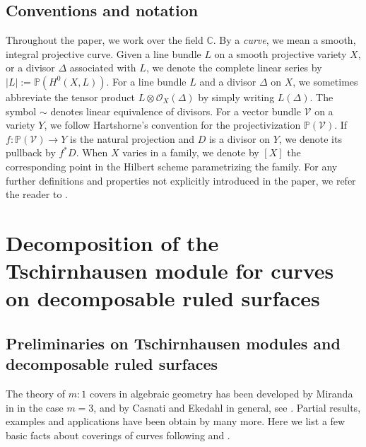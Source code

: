 \documentclass[a4paper,12pt]{amsart}
\begin{document}
\subsection*{Conventions and notation}

Throughout the paper, we work over the field $\mathbb{C}$. By a \emph{curve}, we mean a smooth, integral projective curve. Given a line bundle $L$ on a smooth projective variety $X$, or a divisor $\Delta$ associated with $L$, we denote the complete linear series by $|L| := \mathbb P\left(H^0(X,L)\right)$. For a line bundle $L$ and a divisor $\Delta$ on $X$, we sometimes abbreviate the tensor product $L \otimes \mathcal{O}_X (\Delta)$ by simply writing $L(\Delta)$. The symbol $\sim$ denotes linear equivalence of divisors.
For a vector bundle $\mathcal{V}$ on a variety $Y$, we follow Hartshorne's convention for the projectivization $\mathbb{P} (\mathcal{V})$. If $f : \mathbb{P} (\mathcal{V}) \to Y$ is the natural projection and $D$ is a divisor on $Y$, we denote its pullback by $f^{\ast} D$. When $X$ varies in a family, we denote by  $[X]$ the corresponding point in the Hilbert scheme parametrizing the family. For any further definitions and properties not explicitly introduced in the paper, we refer the reader to \cite{Hart77}.

\medskip



\section{Decomposition of the Tschirnhausen module for curves on decomposable ruled surfaces}\label{Sec2}

\subsection{Preliminaries on Tschirnhausen modules and decomposable ruled surfaces}\label{Sec2.1}

The theory of $m:1$ covers in algebraic geometry has been developed by Miranda in \cite{Mir85} in the case $m = 3$, and by Casnati and Ekedahl in general, see \cite{CE96}. Partial results, examples and applications have been obtain by many more. Here we list a few basic facts about coverings of curves following \cite{CE96} and \cite{Hart77}.
\end{document}
